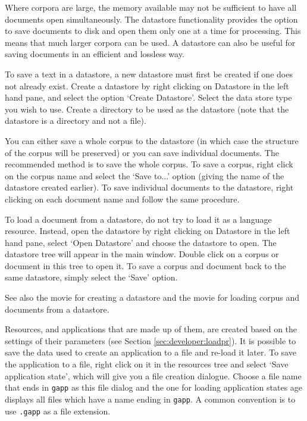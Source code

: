 
Where corpora are large, the memory available may not be sufficient to have all
documents open simultaneously. The datastore functionality provides the option
to save documents to disk and open them only one at a time for
processing. This means that much larger corpora can be used. A datastore can
also be useful for saving documents in an efficient and lossless way. 

To save a text in a datastore, a new datastore must first be created if one
does not already exist. Create a datastore by right clicking on Datastore in
the left hand pane, and select the option `Create Datastore'. Select the data
store type you wish to use. Create a directory to be used as the datastore (note
that the datastore is a directory and not a file).

You can either save a whole corpus to the datastore (in which case the structure
of the corpus will be preserved) or you can save individual documents. The
recommended method is to save the whole corpus. To save a corpus, right click on
the corpus name and select  the `Save to...' option (giving the name of the
datastore created earlier). To save individual documents to the datastore, 
right clicking on each document name and follow the same procedure.

To load a document from a datastore, do not try to load it as a language
resource. Instead, open the datastore by right clicking on Datastore in the
left hand pane, select `Open Datastore' and choose the datastore to open.
The datastore tree will appear in the main window. Double click on a corpus or
document in this tree to open it. To save a corpus and document back to the same
datastore, simply select the `Save' option.

See also the 
{movie for creating a datastore} and the
{movie for loading corpus and documents from a datastore}.



Resources, and applications that are made up of them,
are created based on the settings of their parameters (see Section
\ref{sec:developer:loadpr}). It is possible to save the data used to create
an application to a file and re-load it later. To save the
application to a file, right click on it in the resources tree and select
`Save application state', which will give you a file creation dialogue.
Choose a file name that ends in \texttt{gapp} as this file dialog and
the one for loading application states age displays all files which
have a name ending in \texttt{gapp}. A common convention is to 
use \texttt{.gapp} as a file extension.

